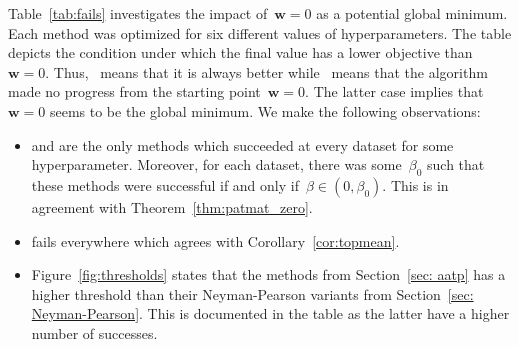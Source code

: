 Table~\ref{tab:fails} investigates the impact of~$\bm{w}=0$ as a potential global minimum. Each method was optimized for six different values of hyperparameters. The table depicts the condition under which the final value has a lower objective than~$\bm{w}=0$. Thus, \yesmark\ means that it is always better while \nomark\ means that the algorithm made no progress from the starting point~$\bm{w} =0$. The latter case implies that~$\bm{w}=0$ seems to be the global minimum. We make the following observations:
\begin{itemize}
  \item \PatMat and \PatMatNP are the only methods which succeeded at every dataset for some hyperparameter. Moreover, for each dataset, there was some~$\beta_0$ such that these methods were successful if and only if~$\beta\in(0,\beta_0)$. This is in agreement with Theorem~\ref{thm:patmat_zero}.
  \item \TopMeanK fails everywhere which agrees with Corollary~\ref{cor:topmean}.
  \item Figure~\ref{fig:thresholds} states that the methods from Section~\ref{sec: aatp} has a higher threshold than their Neyman-Pearson variants from Section~\ref{sec: Neyman-Pearson}. This is documented in the table as the latter have a higher number of successes.
\end{itemize}

